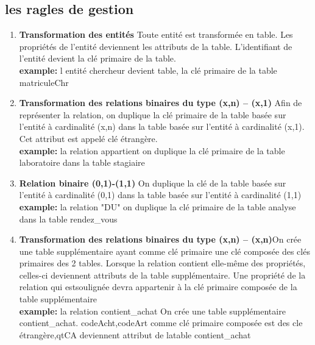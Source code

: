 \subsection{les ragles de gestion}
\begin{enumerate}
    \item \textbf{Transformation des entités} Toute entité est transformée en table. Les propriétés de l'entité deviennent les
    attributs de la table. L'identifiant de l'entité devient la clé primaire de la table.\\
    \textbf{example:} l entité chercheur devient table, la clé primaire de la table matriculeChr
    \item \textbf{Transformation des relations binaires du type (x,n) – (x,1)} Afin de représenter la relation, on duplique la clé primaire de la table basée sur
    l'entité à cardinalité (x,n) dans la table basée sur l'entité à cardinalité (x,1). Cet attribut
    est appelé clé étrangère.\\
    \textbf{example:} la relation appartient on duplique la clé primaire de la table laboratoire dans la table stagiaire 
    \item \textbf{Relation binaire (0,1)-(1,1)} On duplique la clé de la table basée sur l'entité à cardinalité (0,1) dans la table
    basée sur l'entité à cardinalité (1,1)\\
    \textbf{example:} la relation "DU"  on duplique la clé primaire de la table analyse dans la table rendez\_vous 
    \item \textbf{Transformation des relations binaires du type (x,n) – (x,n)}On crée une table supplémentaire ayant comme clé primaire une clé composée des
    clés primaires des 2 tables. Lorsque la relation contient elle-même des propriétés, celles-ci deviennent attributs de la table supplémentaire. 
    Une propriété de la relation qui estsoulignée devra appartenir à la clé primaire composée de la table supplémentaire\\
    \textbf{example:} la relation contient\_achat  On crée une table supplémentaire contient\_achat. codeAcht,codeArt comme clé primaire composée est des cle étrangère,qtCA  deviennent
    attribut de latable contient\_achat
\end{enumerate}

